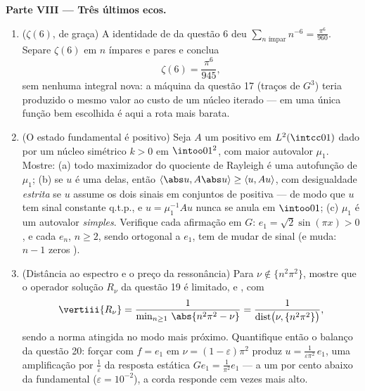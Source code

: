 \begin{problem}
\medskip
\noindent\textbf{Parte VIII --- Três últimos ecos.}
\begin{enumerate}[resume]
  \item ($\zeta(6)$, de graça) A identidade de  da questão 6 deu
        $\sum_{n\text{ ímpar}}n^{-6} =
        \frac{\pi^6}{960}$. Separe $\zeta(6)$ em $n$ ímpares e pares e conclua
        \[
        \zeta(6) = \frac{\pi^6}{945},
        \]
        sem nenhuma integral nova: a máquina da questão 17 (traços de
        $G^3$) teria produzido o mesmo valor ao custo de um núcleo
        iterado ---  em uma única função bem escolhida é aqui a
        rota mais barata.
  \item (O estado fundamental é positivo) Seja $A$ um   positivo em $L^2(\intcc01)$ dado por um núcleo
         simétrico $k > 0$ em $\intoo01^2$, com maior autovalor
        $\mu_1$. Mostre: (a) todo maximizador do quociente de
        Rayleigh é uma autofunção de $\mu_1$; (b) se $u$ é uma
        delas, então $\langle\abs u, A\abs u\rangle \geq \langle u,
        Au\rangle$, com desigualdade \emph{estrita} se $u$
        assume os dois sinais em conjuntos de  positiva --- de
        modo que $u$ tem sinal constante q.t.p., e $u = \mu_1^{-1}Au$ nunca se
        anula em $\intoo01$; (c) $\mu_1$ é um autovalor \emph{simples}.
        Verifique cada afirmação em $G$: $e_1 = \sqrt2\sin(\pi x) > 0$, e cada $e_n$,
        $n
        \geq 2$, sendo ortogonal a $e_1$, tem de mudar de sinal (e
        muda: $n - 1$ zeros ).
  \item (Distância ao espectro e o preço da ressonância) Para $\nu \notin \{n^2\pi^2\}$,
        mostre que o operador solução $R_\nu$ da questão 19 é
        limitado,  e , com
        \[
        \vertiii{R_\nu} =
        \frac1{\min_{n\geq1}\,\abs{n^2\pi^2 - \nu}}
        = \frac1{\operatorname{dist}\bigl(\nu,
        \{n^2\pi^2\}\bigr)},
        \]
        sendo a norma atingida no modo mais próximo. Quantifique então o
        balanço da questão 20: forçar com $f = e_1$ em $\nu = (1 - \varepsilon)\pi^2$ produz $u =
        \frac{1}{\varepsilon\pi^2}\,e_1$,
        uma amplificação por $\frac1\varepsilon$ da resposta estática $Ge_1 =
        \frac1{\pi^2}e_1$ --- a um
        por cento abaixo da fundamental ($\varepsilon = 10^{-2}$), a corda responde cem
        vezes mais alto.
\end{enumerate}
\end{problem}

